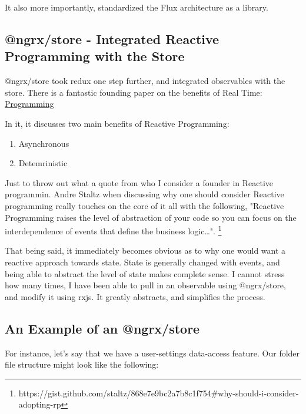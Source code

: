 It also more importantly, standardized the Flux architecture as a library.

\subsection{@ngrx/store - Integrated Reactive Programming with the Store}
@ngrx/store took redux one step further, and integrated observables with the
store. There is a fantastic founding paper on the benefits of Real Time:
\href{http://www-sop.inria.fr/members/Gerard.Berry/Papers/Berry-IFIP-89.pdf}{Programming}

In it, it discusses two main benefits of Reactive Programming:
\begin{enumerate}
  \item Asynchronous
  \item Detemrinistic
\end{enumerate}

Just to throw out what a quote from who I consider a founder in Reactive
programmin. Andre Staltz when discussing why one should consider Reactive
programming really touches on the core of it all with the following, "Reactive
Programming raises the level of abstraction of your code so you can focus on 
the interdependence of events that define the business logic\ldots".
\footnote{https://gist.github.com/staltz/868e7e9bc2a7b8c1f754\#why-should-i-consider-adopting-rp}

That being said, it immediately becomes obvious as to why one would want a
reactive approach towards state. State is generally changed with events, and
being able to abstract the level of state makes complete sense. I cannot stress
how many times, I have been able to pull in an observable using @ngrx/store, and
modify it using rxjs. It greatly abstracts, and simplifies the process.


\subsection{ An Example of an @ngrx/store }

For instance, let's say that we have a user-settings data-access feature. Our
folder file structure might look like the following:

